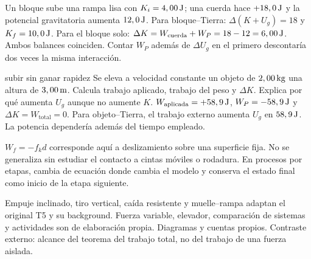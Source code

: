 \documentclass[11pt,a4paper]{article}
\begin{document}
Un bloque sube una rampa lisa con $K_i=4,00\,\mathrm{J}$; una cuerda hace $+18,0\,\mathrm{J}$
y la potencial gravitatoria aumenta $12,0\,\mathrm{J}$.
Para bloque--Tierra: $\Delta(K+U_g)=18$ y $K_f=10,0\,\mathrm{J}$.
Para el bloque solo: $\Delta K=W_{\mathrm{cuerda}}+W_P=18-12=6,00\,\mathrm{J}$.
Ambos balances coinciden. Contar $W_P$ adem\'as de $\Delta U_g$ en el primero
descontar\'ia dos veces la misma interacci\'on.

\begin{exercisebox}{subir sin ganar rapidez}
Se eleva a velocidad constante un objeto de $2,00\,\mathrm{kg}$ una altura de
$3,00\,\mathrm{m}$. Calcula trabajo aplicado, trabajo del peso y $\Delta K$.
Explica por qu\'e aumenta $U_g$ aunque no aumente $K$.
\solutionblock
$W_{\mathrm{aplicada}}=+58,9\,\mathrm{J}$, $W_P=-58,9\,\mathrm{J}$ y
$\Delta K=W_{\mathrm{total}}=0$.
Para objeto--Tierra, el trabajo externo aumenta $U_g$ en $58,9\,\mathrm{J}$.
La potencia depender\'ia adem\'as del tiempo empleado.
\end{exercisebox}

\begin{warnbox}
$W_f=-f_kd$ corresponde aqu\'i a deslizamiento sobre una superficie fija.
No se generaliza sin estudiar el contacto a cintas m\'oviles o rodadura.
En procesos por etapas, cambia de ecuaci\'on donde cambia el modelo y conserva
el estado final como inicio de la etapa siguiente.
\end{warnbox}

Empuje inclinado, tiro vertical, ca\'ida resistente y muelle--rampa adaptan
el original T5 y su background. Fuerza variable, elevador, comparaci\'on de
sistemas y actividades son de elaboraci\'on propia. Diagramas y cuentas propios.
Contraste externo: alcance del teorema del trabajo total, no del trabajo de una fuerza aislada.
\end{document}
